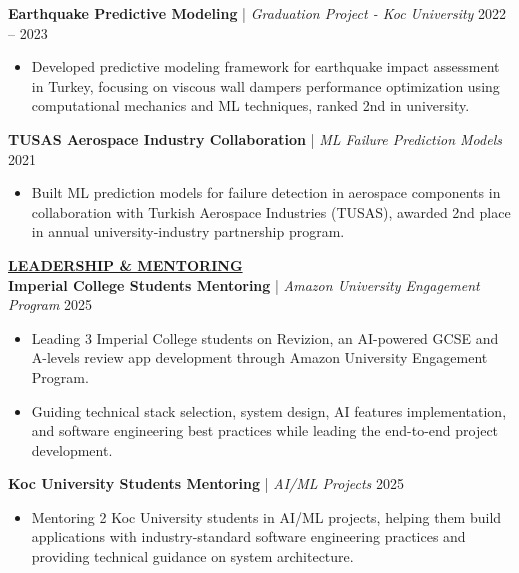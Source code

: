 \documentclass{article}
\newlength{\remaining}
\renewcommand{\section}[1]{
  \vspace{1.0em}\setlength{\remaining}{\textwidth-\widthof{\uppercase{#1}}}
    \noindent\underline{\fontsize{10}{15}\bfseries\uppercase{#1}\hspace*{\remaining}} \\
}
\renewcommand{\subsection}[3]{
    \noindent\textbf{#1} | \emph{#2} \hfill #3  
}
\begin{document}
    \subsection{Earthquake Predictive Modeling}{Graduation Project - Koc University}{2022 – 2023}
    \begin{itemize}
        \item Developed predictive modeling framework for earthquake impact assessment in Turkey, focusing on viscous wall dampers performance optimization using computational mechanics and ML techniques, ranked 2nd in university.
    \end{itemize}

    \subsection{TUSAS Aerospace Industry Collaboration}{ML Failure Prediction Models}{2021}
    \begin{itemize}
        \item Built ML prediction models for failure detection in aerospace components in collaboration with Turkish Aerospace Industries (TUSAS), awarded 2nd place in annual university-industry partnership program.
    \end{itemize}


\section{Leadership \& Mentoring}
\subsection{Imperial College Students Mentoring}{Amazon University Engagement Program}{2025}
\begin{itemize}
    \item Leading 3 Imperial College students on Revizion, an AI-powered GCSE and A-levels review app development through Amazon University Engagement Program.
    \item Guiding technical stack selection, system design, AI features implementation, and software engineering best practices while leading the end-to-end project development.
\end{itemize}

\subsection{Koc University Students Mentoring}{AI/ML Projects}{2025}
\begin{itemize}
    \item Mentoring 2 Koc University students in AI/ML projects, helping them build applications with industry-standard software engineering practices and providing technical guidance on system architecture.
\end{itemize}
\end{document}
